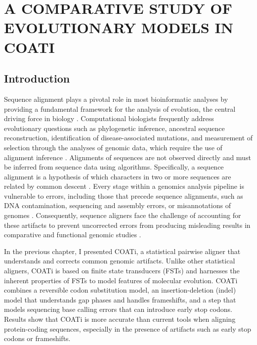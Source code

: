 \chapter{A COMPARATIVE STUDY OF EVOLUTIONARY MODELS IN COATI} \label{ch:marginal}

\section{Introduction}
Sequence alignment plays a pivotal role in most bioinformatic analyses by providing a fundamental framework for the analysis of evolution, the central driving force in biology \citep{aniba2010msa}. Computational biologists frequently address evolutionary questions such as phylogenetic inference, ancestral sequence reconstruction, identification of disease-associated mutations, and measurement of selection through the analyses of genomic data, which require the use of alignment inference \citep{sequence_alignment_rosenberg_2009}. Alignments of sequences are not observed directly and must be inferred from sequence data using algorithms. Specifically, a sequence alignment is a hypothesis of which characters in two or more sequences are related by common descent \citep{cartwright2006logarithmic}. Every stage within a genomics analysis pipeline is vulnerable to errors, including those that precede sequence alignments, such as DNA contamination, sequencing and assembly errors, or misannotations of genomes \citep{zhang2021taper}. Consequently, sequence aligners face the challenge of accounting for these artifacts to prevent uncorrected errors from producing misleading results in comparative and functional genomic studies \citep{estimates_schneider_2009,effect_fletcher_2010,hubisz2011error}.

In the previous chapter, I presented COATi, a statistical pairwise aligner that understands and corrects common genomic artifacts. Unlike other statistical aligners, COATi is based on finite state transducers (FSTs) and harnesses the inherent properties of FSTs to model features of molecular evolution. COATi combines a reversible codon substitution model, an insertion-deletion (indel) model that understands gap phases and handles frameshifts, and a step that models sequencing base calling errors that can introduce early stop codons. Results show that COATi is more accurate than current tools when aligning protein-coding sequences, especially in the presence of artifacts such as early stop codons or frameshifts.

